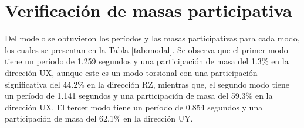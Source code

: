 \section{Verificación de masas participativa}

Del modelo se obtuvieron los períodos y las masas participativas para cada modo, los cuales se presentan en la Tabla \ref{tab:modal}. Se observa que el primer modo tiene un período de 1.259 segundos y una participación de masa del 1.3\% en la dirección UX, aunque este es un modo torsional con una participación significativa del 44.2\% en la dirección RZ, mientras que, el segundo modo tiene un período de 1.141 segundos y una participación de masa del 59.3\% en la dirección UX. El tercer modo tiene un período de 0.854 segundos y una participación de masa del 62.1\% en la dirección UY.

